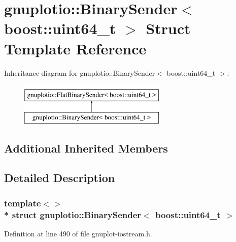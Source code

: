 \hypertarget{structgnuplotio_1_1_binary_sender_3_01boost_1_1uint64__t_01_4}{}\section{gnuplotio\+:\+:Binary\+Sender$<$ boost\+:\+:uint64\+\_\+t $>$ Struct Template Reference}
\label{structgnuplotio_1_1_binary_sender_3_01boost_1_1uint64__t_01_4}
Inheritance diagram for gnuplotio\+:\+:Binary\+Sender$<$ boost\+:\+:uint64\+\_\+t $>$\+:\begin{figure}[H]
\begin{center}
\leavevmode
\includegraphics[height=2.000000cm]{structgnuplotio_1_1_binary_sender_3_01boost_1_1uint64__t_01_4}
\end{center}
\end{figure}
\subsection*{Additional Inherited Members}


\subsection{Detailed Description}
\subsubsection*{template$<$$>$\\*
struct gnuplotio\+::\+Binary\+Sender$<$ boost\+::uint64\+\_\+t $>$}



Definition at line 490 of file gnuplot-\/iostream.\+h.


